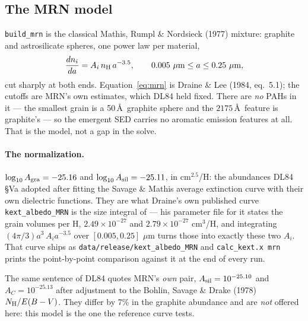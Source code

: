 \documentclass{my_memo}
\newcommand{\code}[1]{\texttt{#1}}
\newcommand{\um}{\ensuremath{\,\mu\mathrm{m}}}
\begin{document}
\subsection{The MRN model}\label{sec:mrn}

\code{build\_mrn} is the classical Mathis, Rumpl \& Nordsieck (1977) mixture:
graphite and astrosilicate spheres, one power law per material,
%
\begin{equation}
  \frac{dn_i}{da} = A_i\, n_{\rm H}\, a^{-3.5},
  \qquad 0.005\,\um \le a \le 0.25\,\um,
  \label{eq:mrn}
\end{equation}
%
cut sharply at both ends. Equation~\eqref{eq:mrn} is Draine \& Lee (1984,
eq.~5.1); the cutoffs are MRN's own estimates, which DL84 held fixed. There are
\emph{no} PAHs in it --- the smallest grain is a 50\,\AA\ graphite sphere and
the $2175$\,\AA\ feature is graphite's --- so the emergent SED carries no
aromatic emission features at all. That is the model, not a gap in the solve.

\paragraph{The normalization.} $\log_{10} A_{\rm gra} = -25.16$ and
$\log_{10} A_{\rm sil} = -25.11$, in cm$^{2.5}$/H: the abundances DL84 \S Va
adopted after fitting the Savage \& Mathis average extinction curve with their
own dielectric functions. They are what Draine's own published curve
\code{kext\_albedo\_MRN} is the size integral of --- his parameter file for it
states the grain volumes per H, $2.49\times10^{-27}$ and $2.79\times10^{-27}$
cm$^3$/H, and integrating $(4\pi/3)a^3\,A_i a^{-3.5}$ over $[0.005, 0.25]\,\um$
turns those into exactly these two $A_i$. That curve ships as
\code{data/release/kext\_albedo\_MRN} and \code{calc\_kext.x mrn} prints the
point-by-point comparison against it at the end of every run.

\noindent The same sentence of DL84 quotes MRN's \emph{own} pair,
$A_{\rm sil} = 10^{-25.10}$ and $A_C = 10^{-25.13}$ after adjustment to the
Bohlin, Savage \& Drake (1978) $N_{\rm H}/E(B-V)$. They differ by 7\% in the
graphite abundance and are \emph{not} offered here: this model is the one the
reference curve tests.
\end{document}
